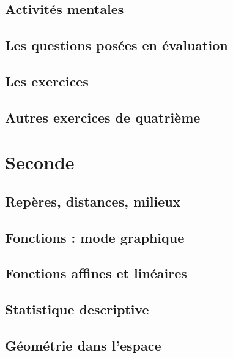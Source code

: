 \documentclass[a4paper,10pt]{book}
\begin{document}
\chapter{Activités mentales}


\chapter{Les questions posées en évaluation}


\chapter{Les exercices}


\chapter{Autres exercices de quatrième}


\part{Seconde}

\chapter{Repères, distances, milieux}


\chapter{Fonctions : mode graphique}


\chapter{Fonctions affines et linéaires}


\chapter{Statistique descriptive}


\chapter{Géométrie dans l'espace}

\end{document}

